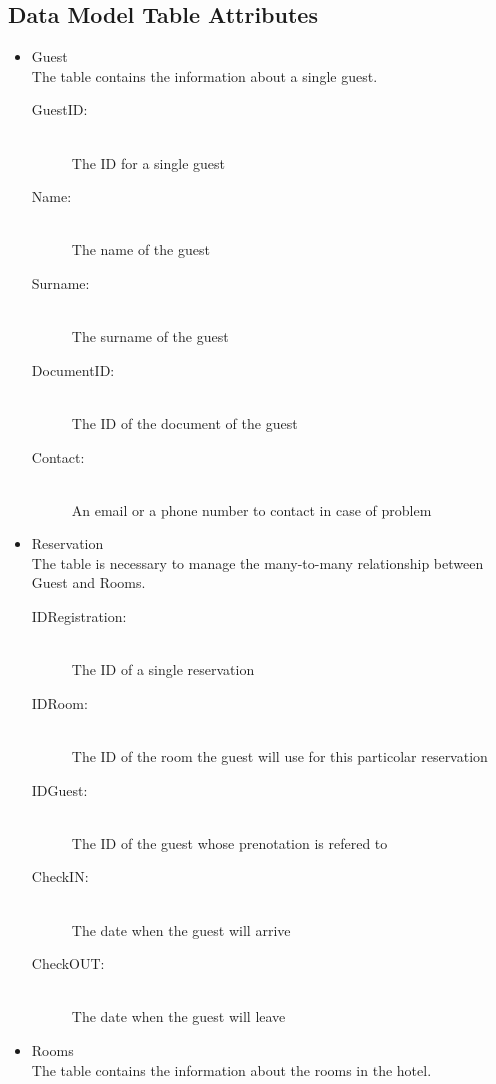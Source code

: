 \subsection{Data Model Table Attributes}

\begin{itemize}
  \item Guest \\ 
    The table contains the information about a single guest.
    \begin{description}
      \item[GuestID:] \hfill \\
        The ID for a single guest
      \item[Name:] \hfill \\
        The name of the guest
      \item[Surname:] \hfill \\
        The surname of the guest
      \item[DocumentID:] \hfill \\
        The ID of the document of the guest
      \item[Contact:] \hfill \\
        An email or a phone number to contact in case of problem
    \end{description}
  \item Reservation \\
    The table is necessary to manage the many-to-many relationship between Guest and Rooms.
    \begin{description}
      \item[IDRegistration:] \hfill \\ The ID of a single reservation
      \item[IDRoom:] \hfill \\ The ID of the room the guest will use for this particolar reservation
      \item[IDGuest:] \hfill \\ The ID of the guest whose prenotation is refered to
      \item[CheckIN:] \hfill \\ The date when the guest will arrive
      \item[CheckOUT:] \hfill \\ The date when the guest will leave
    \end{description}    
  \item Rooms \\
    The table contains the information about the rooms in the hotel.

\end{itemize}
